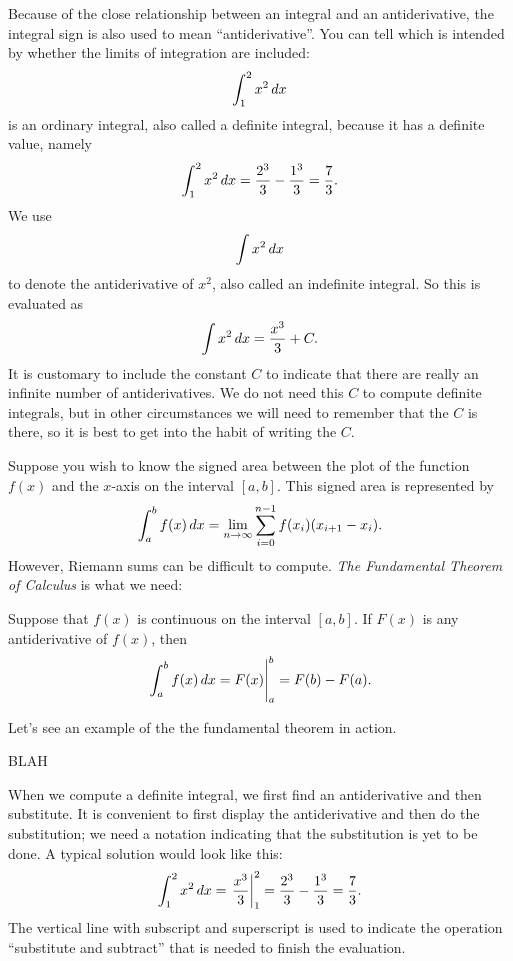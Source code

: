 \begin{mainTheorem}
Because of the close relationship between an integral and an
antiderivative, the integral sign is also used to mean
``antiderivative''. You can tell which is intended by whether the
limits of integration are included:
$$
  \int_1^2 x^2\, d x
$$
is an ordinary integral, also called a 
{\dfont definite integral\/},
because it has a definite value, namely
$$
  \int_1^2 x^2\, d x={2^3\over3}-{1^3\over3}={7\over3}.
$$
We use
$$
  \int x^2\, d x
$$
to denote the antiderivative of $x^2$, also called an
{\dfont indefinite integral\/}.
So this is evaluated as
$$
  \int x^2\, d x = {x^3\over 3}+C.
$$
It is customary to include the constant $C$ to indicate that there are
really an infinite number of antiderivatives. We do not need this $C$
to compute definite integrals, but in other circumstances we will need
to remember that the $C$ is there, so it is best to get into the habit
of writing the $C$.



Suppose you wish to know the signed area between the plot of the
function $f(x)$ and the $x$-axis on the interval $[a,b]$. This signed area is represented by
\[
\int_a^b f(x) \, d x= \lim_{n\to \infty}\sum_{i=0}^{n-1} f(x_i) (x_{i+1}-x_i).
\]
However, Riemann sums can be difficult to compute. \textit{The Fundamental
Theorem of Calculus} is what we need:

\begin{mainTheorem}
\label{thm:fundamental_theorem_II}
Suppose that $f(x)$ is continuous on the interval $[a,b]$. If $F(x)$
is any antiderivative of $f(x)$, then
\[
  \left.\int_a^b f(x)\, d x = F(x) \right|_a^b = F(b)-F(a).
\]
\end{mainTheorem}


Let's see an example of the the fundamental theorem in action.

\begin{example}
BLAH
\end{example}



When we compute a definite integral, we first find an antiderivative
and then substitute. It is convenient to first display the
antiderivative and then do the substitution; we need a notation
indicating that the substitution is yet to be done. A typical solution
would look like this:
$$
  \int_1^2 x^2\, d x=\left.{x^3\over 3}\right|_1^2 = 
  {2^3\over3}-{1^3\over3}={7\over3}.
$$
The vertical line with subscript and superscript is used to indicate
the operation ``substitute and subtract'' that is needed to finish the
evaluation. 


\end{mainTheorem}

